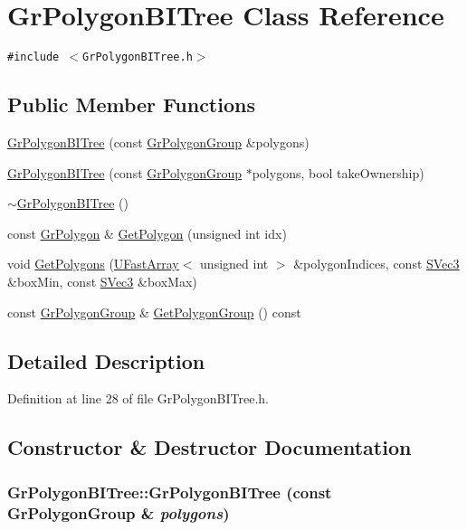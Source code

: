 \hypertarget{class_gr_polygon_b_i_tree}{
\section{GrPolygonBITree Class Reference}
\label{class_gr_polygon_b_i_tree}
}
{\tt \#include $<$GrPolygonBITree.h$>$}

\subsection*{Public Member Functions}
\begin{CompactItemize}
\item 
\hyperlink{class_gr_polygon_b_i_tree_df526ad4a8b93ff3f03ba67898ed926c}{GrPolygonBITree} (const \hyperlink{class_gr_polygon_group}{GrPolygonGroup} \&polygons)
\item 
\hyperlink{class_gr_polygon_b_i_tree_6c3fb73e6110c988c4b26a6e17fa4db6}{GrPolygonBITree} (const \hyperlink{class_gr_polygon_group}{GrPolygonGroup} $\ast$polygons, bool takeOwnership)
\item 
\hyperlink{class_gr_polygon_b_i_tree_069fe42f81a14d4beb10c2e1b16bc5f4}{$\sim$GrPolygonBITree} ()
\item 
const \hyperlink{class_gr_polygon}{GrPolygon} \& \hyperlink{class_gr_polygon_b_i_tree_6b74a3b2dd30c9220f0ed1d3a596e68c}{GetPolygon} (unsigned int idx)
\item 
void \hyperlink{class_gr_polygon_b_i_tree_996913f341c57731dede839590ca4481}{GetPolygons} (\hyperlink{class_u_fast_array}{UFastArray}$<$ unsigned int $>$ \&polygonIndices, const \hyperlink{struct_s_vec3}{SVec3} \&boxMin, const \hyperlink{struct_s_vec3}{SVec3} \&boxMax)
\item 
const \hyperlink{class_gr_polygon_group}{GrPolygonGroup} \& \hyperlink{class_gr_polygon_b_i_tree_c3a04636c00a74f788587e60610cf5bf}{GetPolygonGroup} () const 
\end{CompactItemize}


\subsection{Detailed Description}


Definition at line 28 of file GrPolygonBITree.h.

\subsection{Constructor \& Destructor Documentation}
\hypertarget{class_gr_polygon_b_i_tree_df526ad4a8b93ff3f03ba67898ed926c}{
\subsubsection[{GrPolygonBITree}]{\setlength{\rightskip}{0pt plus 5cm}GrPolygonBITree::GrPolygonBITree (const {\bf GrPolygonGroup} \& {\em polygons})}}
\label{class_gr_polygon_b_i_tree_df526ad4a8b93ff3f03ba67898ed926c}




